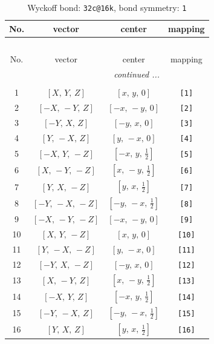 \documentclass[fleqn,8pt]{jsarticle}
\begin{document}
\begin{longtable}{cccc}
\caption{Wyckoff bond: {\tt 32c@16k}, bond symmetry: {\tt 1}}
 \\
 \hline \hline
No. & vector & center & mapping \\ \hline \endfirsthead

\multicolumn{3}{l}{\tablename\ \thetable{}} \\
 \hline \hline
No. & vector & center & mapping \\ \hline \endhead

 \hline \hline
\multicolumn{3}{r}{\footnotesize\it continued ...} \\ \endfoot

 \hline \hline
\multicolumn{3}{r}{} \\ \endlastfoot

1 & $\left[ X,\, Y,\, Z \right]$ & $\left[ x,\, y,\, 0 \right]$ & {\tt [1]} \\ \hline
2 & $\left[ - X,\, - Y,\, Z \right]$ & $\left[ - x,\, - y,\, 0 \right]$ & {\tt [2]} \\ \hline
3 & $\left[ - Y,\, X,\, Z \right]$ & $\left[ - y,\, x,\, 0 \right]$ & {\tt [3]} \\ \hline
4 & $\left[ Y,\, - X,\, Z \right]$ & $\left[ y,\, - x,\, 0 \right]$ & {\tt [4]} \\ \hline
5 & $\left[ - X,\, Y,\, - Z \right]$ & $\left[ - x,\, y,\, \frac{1}{2} \right]$ & {\tt [5]} \\ \hline
6 & $\left[ X,\, - Y,\, - Z \right]$ & $\left[ x,\, - y,\, \frac{1}{2} \right]$ & {\tt [6]} \\ \hline
7 & $\left[ Y,\, X,\, - Z \right]$ & $\left[ y,\, x,\, \frac{1}{2} \right]$ & {\tt [7]} \\ \hline
8 & $\left[ - Y,\, - X,\, - Z \right]$ & $\left[ - y,\, - x,\, \frac{1}{2} \right]$ & {\tt [8]} \\ \hline
9 & $\left[ - X,\, - Y,\, - Z \right]$ & $\left[ - x,\, - y,\, 0 \right]$ & {\tt [9]} \\ \hline
10 & $\left[ X,\, Y,\, - Z \right]$ & $\left[ x,\, y,\, 0 \right]$ & {\tt [10]} \\ \hline
11 & $\left[ Y,\, - X,\, - Z \right]$ & $\left[ y,\, - x,\, 0 \right]$ & {\tt [11]} \\ \hline
12 & $\left[ - Y,\, X,\, - Z \right]$ & $\left[ - y,\, x,\, 0 \right]$ & {\tt [12]} \\ \hline
13 & $\left[ X,\, - Y,\, Z \right]$ & $\left[ x,\, - y,\, \frac{1}{2} \right]$ & {\tt [13]} \\ \hline
14 & $\left[ - X,\, Y,\, Z \right]$ & $\left[ - x,\, y,\, \frac{1}{2} \right]$ & {\tt [14]} \\ \hline
15 & $\left[ - Y,\, - X,\, Z \right]$ & $\left[ - y,\, - x,\, \frac{1}{2} \right]$ & {\tt [15]} \\ \hline
16 & $\left[ Y,\, X,\, Z \right]$ & $\left[ y,\, x,\, \frac{1}{2} \right]$ & {\tt [16]} \\
\end{longtable}
\end{document}

